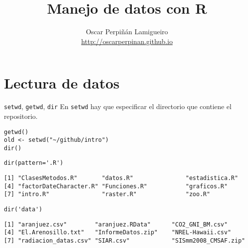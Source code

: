 \documentclass[xcolor={usenames,svgnames,dvipsnames}]{beamer}
\author{Oscar Perpiñán Lamigueiro \\ \url{http://oscarperpinan.github.io}}
\date{}
\title{Manejo de datos con R}
\begin{document}
\maketitle

\section{Lectura de datos}
\label{sec:org8715787}
\begin{frame}[fragile,label={sec:org6fe08b3}]{\texttt{setwd}, \texttt{getwd}, \texttt{dir}}
 En \texttt{setwd} hay que especificar el directorio que contiene el repositorio.
\lstset{language=r,label= ,caption= ,captionpos=b,numbers=none}
\begin{lstlisting}
getwd()
old <- setwd("~/github/intro")
dir()
\end{lstlisting}

\lstset{language=r,label= ,caption= ,captionpos=b,numbers=none}
\begin{lstlisting}
dir(pattern='.R')
\end{lstlisting}

\begin{verbatim}
[1] "ClasesMetodos.R"       "datos.R"               "estadistica.R"        
[4] "factorDateCharacter.R" "Funciones.R"           "graficos.R"           
[7] "intro.R"               "raster.R"              "zoo.R"
\end{verbatim}

\lstset{language=r,label= ,caption= ,captionpos=b,numbers=none}
\begin{lstlisting}
dir('data')
\end{lstlisting}

\begin{verbatim}
[1] "aranjuez.csv"        "aranjuez.RData"      "CO2_GNI_BM.csv"     
[4] "El.Arenosillo.txt"   "InformeDatos.zip"    "NREL-Hawaii.csv"    
[7] "radiacion_datas.csv" "SIAR.csv"            "SISmm2008_CMSAF.zip"
\end{verbatim}
\end{frame}
\end{document}
